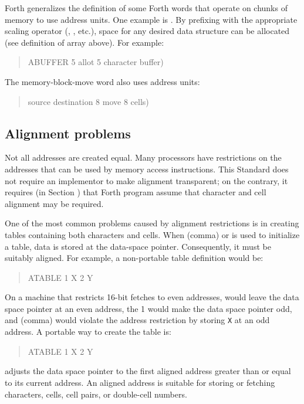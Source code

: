  Forth generalizes the definition of some Forth words that operate
on chunks of memory to use address units. One example is .
By prefixing  with the appropriate scaling operator
(, , etc.), space for any desired data structure
can be allocated (see definition of array above). For example:
\begin{quote}\ttfamily
	 ABUFFER 5  
	 allot 5 character buffer)
\end{quote}
The memory-block-move word also uses address units:
\begin{quote}\ttfamily
source destination 8    move 8 cells)
\end{quote}


\subsection{Alignment problems} %

Not all addresses are created equal. Many processors have restrictions
on the addresses that can be used by memory access instructions. This
Standard does not require an implementor  to make
alignment transparent; on the contrary, it requires (in Section
) that  Forth
program assume that character and cell alignment may be required.

One of the most common problems caused by alignment restrictions
is in creating tables containing both characters and cells. When
\word{,} (comma) or  is used to initialize a table, data
is stored at the data-space pointer. Consequently, it must be
suitably aligned. For example, a non-portable table definition
would be:
\begin{quote}\ttfamily
	 ATABLE 1  X \word{,} 2  Y \word{,}
\end{quote}
On a machine that restricts 16-bit fetches to even addresses,
 would leave the data space pointer at an even address,
the 1  would make the data space pointer odd, and \word{,}
(comma) would violate the address restriction by storing \texttt{X}
at an odd address. A portable way to create the table is:
\begin{quote}\ttfamily
	 ATABLE 1 
		 X \word{,} 2   Y \word{,}
\end{quote}
 adjusts the data space pointer to the first aligned
address greater than or equal to its current address. An aligned
address is suitable for storing or fetching characters, cells, cell
pairs, or double-cell numbers.

